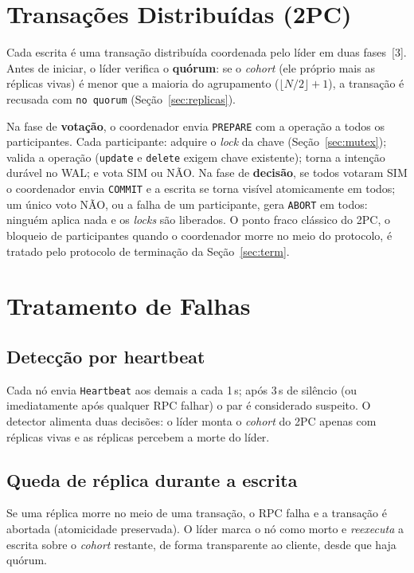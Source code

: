\documentclass[10pt,twocolumn]{article}
\begin{document}
\section{Transações Distribuídas (2PC)}
\label{sec:2pc}

Cada escrita é uma transação distribuída coordenada pelo líder em duas
fases~[3]. Antes de iniciar, o líder verifica o \textbf{quórum}: se o
\emph{cohort} (ele próprio mais as réplicas vivas) é menor que a maioria do
agrupamento ($\lfloor N/2\rfloor+1$), a transação é recusada com
\texttt{no quorum} (Seção~\ref{sec:replicas}).

Na fase de \textbf{votação}, o coordenador envia \texttt{PREPARE} com a
operação a todos os participantes. Cada participante: adquire o
\emph{lock} da chave (Seção~\ref{sec:mutex}); valida a operação
(\texttt{update} e \texttt{delete} exigem chave existente); torna a
intenção durável no WAL; e vota SIM ou NÃO. Na fase de \textbf{decisão},
se todos votaram SIM o coordenador envia \texttt{COMMIT} e a escrita se
torna visível atomicamente em todos; um único voto NÃO, ou a falha de um
participante, gera \texttt{ABORT} em todos: ninguém aplica nada e os
\emph{locks} são liberados. O ponto fraco clássico do 2PC, o bloqueio de
participantes quando o coordenador morre no meio do protocolo, é tratado
pelo protocolo de terminação da Seção~\ref{sec:term}.

\section{Tratamento de Falhas}
\label{sec:falhas}

\subsection{Detecção por heartbeat}

Cada nó envia \texttt{Heartbeat} aos demais a cada 1\,s; após 3\,s de
silêncio (ou imediatamente após qualquer RPC falhar) o par é considerado
suspeito. O detector alimenta duas decisões: o líder monta o \emph{cohort}
do 2PC apenas com réplicas vivas e as réplicas percebem a morte do líder.

\subsection{Queda de réplica durante a escrita}

Se uma réplica morre no meio de uma transação, o RPC falha e a transação é
abortada (atomicidade preservada). O líder marca o nó como morto e
\emph{reexecuta} a escrita sobre o \emph{cohort} restante, de forma
transparente ao cliente, desde que haja quórum.
\end{document}
